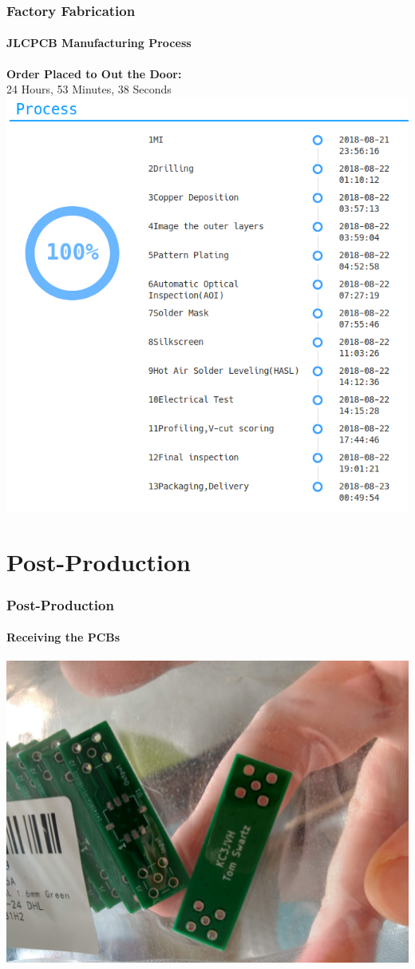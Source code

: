 \documentclass[]{beamer}
\begin{document}
\begin{frame}
    \frametitle{Factory Fabrication}
    \framesubtitle{JLCPCB Manufacturing Process}
    \begin{center}
        \textbf{Order Placed to Out the Door:}\\24 Hours, 53 Minutes, 38 Seconds
        \includegraphics[height=0.65\paperheight,keepaspectratio]{images/fab_timeline.png}
    \end{center}
\end{frame}

\section[Post-Production]{Post-Production}
\begin{frame}
    \frametitle{Post-Production}
    \framesubtitle{Receiving the PCBs}
    \begin{center}
        \includegraphics[height=0.70\paperheight,keepaspectratio]{images/packaging.jpg}
    \end{center}
\end{frame}
\end{document}
